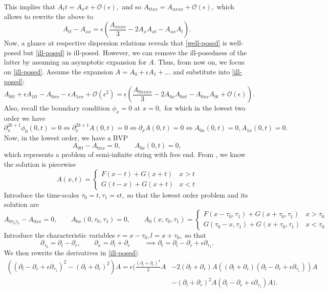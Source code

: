 \documentclass[10pt,reqno,oneside,a4paper]{article}
\begin{document}
This implies that $A_tt = A_xx + \mathcal{O}(\epsilon),$ and so $A_{ttxx} = A_{xxxx} + \mathcal{O}(\epsilon),$ which allows to rewrite the above to
\begin{equation}\label{ill-posed}
A_{tt} - A_{xx} = \epsilon\left(\frac{A_{xxxx}}{3} - 2A_xA_{xt} - A_{xx}A_{t}\right).
\end{equation}
Now, a glance at respective dispersion relations reveals that \eqref{well-posed} is well-posed but \eqref{ill-posed} is ill-posed. However, we can remove the ill-posedness of the latter by assuming an asymptotic expansion for $A.$ Thus, from now on, we focus on \eqref{ill-posed}. Assume the expansion $A= A_0 + \epsilon A_1 + \ldots$ and substitute into \eqref{ill-posed}:
\[  
A_{0tt} + \epsilon A_{1tt} - A_{0xx}  - \epsilon A_{1xx} + \mathcal{O}(\epsilon^2) = \epsilon \left( \frac{A_{0xxxx}}{3} - 2 A_{0x}A_{0xt} - A_{0xx}A_{0t} + \mathcal{O}(\epsilon)\right).
\]
Also, recall the boundary condition $\phi_x = 0$ at $x = 0,$ for which in the lowest two order we have 
\[ 
\partial_x^{2k+1}\phi_0(0,t) = 0 \iff \partial_x^{2k+1}A(0,t) = 0 \iff \partial_xA(0,t) = 0 \iff  A_{0x}(0,t) = 0, A_{1x}(0,t) = 0.
\]
Now, in the lowest order, we have a BVP
\[ 
A_{0tt} - A_{0xx} = 0, \qquad A_{0x}(0,t) = 0,
\]
which represents a problem of semi-infinite string with free end. From \cite[Chapter 9, p.64-65]{knobel}, we know the solution is piecewise
\[ 
A(x,t) = \begin{cases} F(x-t) +G(x + t) & x>t  \\ G(t- x) + G(x+t) & x<t \end{cases}
\]
Introduce the time-scales $\tau_0 = t, \tau_1 = \epsilon t,$ so that the lowest order problem and its solution are
\[ 
A_{0\tau_0\tau_0} - A_{0xx} = 0, \qquad A_{0x}(0,\tau_0, \tau_1) = 0, \qquad A_0(x,\tau_0, \tau_1) = \begin{cases} F(x-\tau_0, \tau_1) +G(x + \tau_0, \tau_1) & x>\tau_0  \\ G(\tau_0- x, \tau_1) + G(x+\tau_0, \tau_1) & x<\tau_0 \end{cases}
\] 
Introduce the characteristic variables $r =x - \tau_0, l = x + \tau_0,$ so that
\[ 
\partial_{\tau_0} = \partial_l - \partial_r, \qquad \partial_x = \partial_l + \partial_r \qquad \implies \partial_{t} = \partial_l - \partial_r + \epsilon \partial_{\tau_1}. 
\]
We then rewrite the derivatives in \eqref{ill-posed}:
\begin{align*}
\left( (\partial_l - \partial_r + \epsilon \partial_{\tau_1})^2 - (\partial_l + \partial_r)^2 \right)A = \epsilon \bigg(\frac{(\partial_l + \partial_r)^4}{3}A &- 2(\partial_l + \partial_r)A ((\partial_l + \partial_r)(\partial_l - \partial_r + \epsilon \partial_{\tau_1}))A \\
&- (\partial_l + \partial_r)^2 A (\partial_l - \partial_r + \epsilon \partial_{\tau_1})A \bigg).
\end{align*}
\end{document}
